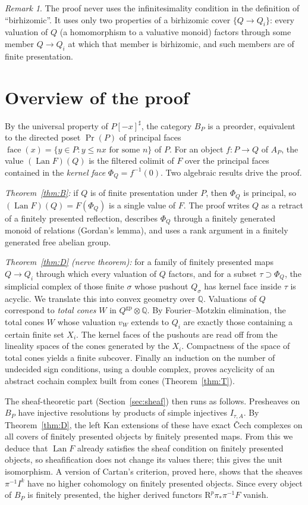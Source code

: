\documentclass[11pt]{article}
\theoremstyle{definition}
\theoremstyle{remark}
\newtheorem{remark}[theorem]{Remark}
\newcommand{\QQ}{\mathbb{Q}}
\newcommand{\gp}{\mathrm{gp}}
\newcommand{\face}{\operatorname{face}}
\newcommand{\Prin}{\operatorname{Pr}}
\newcommand{\Lan}{\operatorname{Lan}}
\begin{document}
\begin{remark}
The proof never uses the infinitesimality condition in the definition of ``birhizomic''. It uses only two properties of a birhizomic cover $\{Q\to Q_i\}$: every valuation of $Q$ (a homomorphism to a valuative monoid) factors through some member $Q\to Q_i$ at which that member is birhizomic, and such members are of finite presentation.
\end{remark}

\section{Overview of the proof}

By the universal property of $P[-x]^\sharp$, the category $B_P$ is a preorder, equivalent to the directed poset $\Prin(P)$ of principal faces $\face(x)=\{y\in P: y\le nx \text{ for some } n\}$ of $P$. For an object $f\colon P\to Q$ of $A_P$, the value $(\Lan F)(Q)$ is the filtered colimit of $F$ over the principal faces contained in the \emph{kernel face} $\Phi_Q=f^{-1}(0)$. Two algebraic results drive the proof.

\emph{Theorem~\ref{thm:B}:} if $Q$ is of finite presentation under $P$, then $\Phi_Q$ is principal, so $(\Lan F)(Q)=F(\Phi_Q)$ is a single value of $F$. The proof writes $Q$ as a retract of a finitely presented reflection, describes $\Phi_Q$ through a finitely generated monoid of relations (Gordan's lemma), and uses a rank argument in a finitely generated free abelian group.

\emph{Theorem~\ref{thm:D} (nerve theorem):} for a family of finitely presented maps $Q\to Q_i$ through which every valuation of $Q$ factors, and for a subset $\tau\supset\Phi_Q$, the simplicial complex of those finite $\sigma$ whose pushout $Q_\sigma$ has kernel face inside $\tau$ is acyclic. We translate this into convex geometry over $\QQ$. Valuations of $Q$ correspond to \emph{total cones} $W$ in $Q^{\gp}\otimes\QQ$. By Fourier--Motzkin elimination, the total cones $W$ whose valuation $v_W$ extends to $Q_i$ are exactly those containing a certain finite set $X_i$. The kernel faces of the pushouts are read off from the lineality spaces of the cones generated by the $X_i$. Compactness of the space of total cones yields a finite subcover. Finally an induction on the number of undecided sign conditions, using a double complex, proves acyclicity of an abstract cochain complex built from cones (Theorem~\ref{thm:T}).

The sheaf-theoretic part (Section~\ref{sec:sheaf}) then runs as follows. Presheaves on $B_P$ have injective resolutions by products of simple injectives $I_{\tau,A}$. By Theorem~\ref{thm:D}, the left Kan extensions of these have exact Čech complexes on all covers of finitely presented objects by finitely presented maps. From this we deduce that $\Lan F$ already satisfies the sheaf condition on finitely presented objects, so sheafification does not change its values there; this gives the unit isomorphism. A version of Cartan's criterion, proved here, shows that the sheaves $\pi^{-1}I^k$ have no higher cohomology on finitely presented objects. Since every object of $B_P$ is finitely presented, the higher derived functors $\mathrm R^p\pi_*\pi^{-1}F$ vanish.
\end{document}
